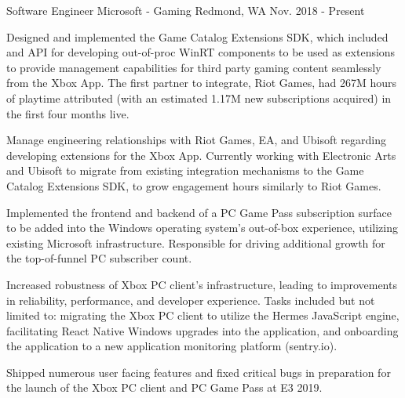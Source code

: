 
\begin{cventries}

  \cventry
    {Software Engineer} %
    {Microsoft - Gaming} %
    {Redmond, WA} %
    {Nov. 2018 - Present} %
    {
      \begin{cvitems} %
        \item{Designed and implemented the Game Catalog Extensions SDK, which included and API for developing out-of-proc WinRT components to be used as extensions to provide management capabilities for third party gaming content seamlessly from the Xbox App. The first partner to integrate, Riot Games, had 267M hours of playtime attributed (with an estimated 1.17M new subscriptions acquired) in the first four months live.} 
        \item{Manage engineering relationships with Riot Games, EA, and Ubisoft regarding developing extensions for the Xbox App. Currently working with Electronic Arts and Ubisoft to migrate from existing integration mechanisms to the Game Catalog Extensions SDK, to grow engagement hours similarly to Riot Games. } 
        \item{Implemented the frontend and backend of a PC Game Pass subscription surface to be added into the Windows operating system's out-of-box experience, utilizing existing Microsoft infrastructure. Responsible for driving additional growth for the top-of-funnel PC subscriber count.} 
        \item{Increased robustness of Xbox PC client's infrastructure, leading to improvements in reliability, performance, and developer experience. Tasks included but not limited to: migrating the Xbox PC client to utilize the Hermes JavaScript engine, facilitating React Native Windows upgrades into the application, and onboarding the application to a new application monitoring platform (sentry.io).}
	      \item{Shipped numerous user facing features and fixed critical bugs in preparation for the launch of the Xbox PC client and PC Game Pass at E3 2019.}	
      \end{cvitems}
    }


\end{cventries}
